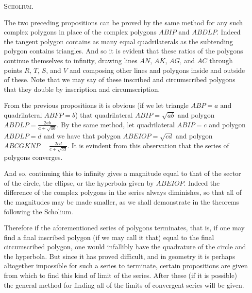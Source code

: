 \documentclass[11pt,letterpaper]{book}
\begin{document}
\begin{samepage}
\begin{center}
\large\textsc{Scholium.}
\end{center}
\end{samepage}

The two preceding propositions can be proved by the same method for any such
complex polygons in place of the complex polygons $ABIP$ and $ABDLP$. Indeed the
tangent polygon contains as many equal quadrilaterals as the subtending polygon
contains triangles. And so it is evident that these ratios of the polygons
continue themselves to infinity, drawing lines $AN$, $AK$, $AG$, and $AC$
through points $R$, $T$, $S$, and $V$ and composing other lines and polygons
inside and outside of these. Note that we may say of these inscribed and
circumscribed polygons that they double by inscription and circumscription.

From the previous propositions it is obvious (if we let triangle $ABP = a$ and
quadrilateral $ABFP = b$) that quadrilateral $ABIP = \sqrt{ab}$ and polygon
$ABDLP = \frac{2ab}{a+\sqrt{ab}}$. By the same method, let quadrilateral $ABIP =
c$ and polygon $ABDLP = d$ and we have that polygon $ABEIOP = \sqrt{cd}$ and
polygon $ABCGKNP = \frac{2cd}{c+\sqrt{cd}}$. It is evindent from this
observation that the series of polygons converges.

And so, continuing this to infinity gives a magnitude equal to that of
the sector of the circle, the ellipse, or the hyperbola given by $ABEIOP$.
Indeed the difference of the complex polygons in the series always diminishes,
so that all of the magnitudes may be made smaller, as we shall demonstrate in
the theorems following the Scholium.

Therefore if the aforementioned series of polygons terminates, that is,
if one may find a final inscribed polygon (if we may call it that) equal to the
final circumscribed polygon, one would infallibly have the quadrature of the
circle and the hyperbola. But since it has proved difficult, and in geometry it
is perhaps altogether impossible for such a series to terminate, certain
propositions are given from which to find this kind of limit of the series.
After these (if it is possible) the general method for finding all of the
limits of convergent series will be given.

\end{document}
